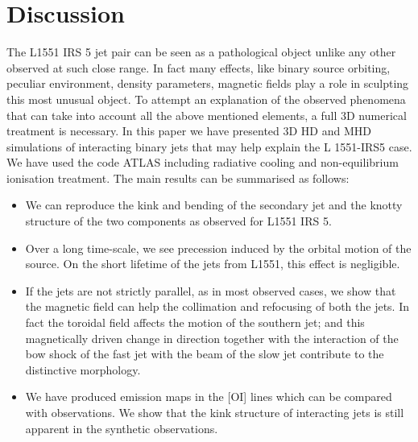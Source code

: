 \documentclass{aa}
\begin{document}
\section{Discussion}\label{Discussion and Summary}


	The L1551 IRS 5 jet pair can be seen as a pathological 
object unlike any other observed at such close range.
In fact many effects, like binary source orbiting, peculiar 
environment, density parameters, magnetic fields play a role 
in sculpting this most unusual object. To attempt an explanation of the 
observed phenomena that can take into account all the above mentioned elements,
a full 3D numerical treatment is necessary.
In this paper we have presented 3D HD and MHD simulations of 
interacting binary jets that may help explain the L 1551-IRS5 case. 
We have used the code ATLAS including radiative cooling 
and non-equilibrium ionisation treatment.
The main results can be summarised as follows: 

\begin{itemize}
\item We can reproduce the kink and bending of the secondary jet and the knotty
structure of the two components as observed for L1551 IRS 5.
\item Over a long time-scale, we see precession induced 
by the orbital motion of the source. 
On the short lifetime of the jets from L1551, this effect is negligible. 
\item If the jets are not strictly parallel, 
as in most observed cases, we show that
the magnetic field can help the collimation and refocusing of both the jets.
In fact the toroidal field affects the motion of the southern jet; and
this magnetically driven change in direction together with the interaction
of the bow shock of the fast jet with the beam of the slow jet 
contribute to the distinctive morphology.
\item We have produced emission maps in the [OI] lines
which can be compared with observations.
We show that the kink structure of interacting jets is 
still apparent in the synthetic 
observations.
\end{itemize}
\end{document}
